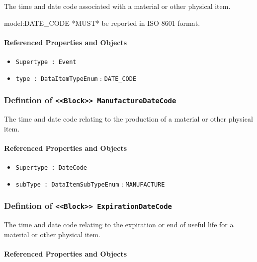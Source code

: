 The time and date code associated with a material or other physical item.
  
 {model:DATE_CODE} *MUST* be reported in ISO 8601 format.

\FloatBarrier
\paragraph{Referenced Properties and Objects}

\begin{itemize}
\item \texttt{Supertype : Event}

\item \texttt{type : DataItemTypeEnum} : \texttt{DATE_CODE}

\end{itemize}
\FloatBarrier
\subsubsection{Defintion of \texttt{<<Block>> ManufactureDateCode}}
  \label{type:ManufactureDateCode}

\FloatBarrier

The time and date code relating to the production of a material or other physical item.

\FloatBarrier
\paragraph{Referenced Properties and Objects}

\begin{itemize}
\item \texttt{Supertype : DateCode}

\item \texttt{subType : DataItemSubTypeEnum} : \texttt{MANUFACTURE}

\end{itemize}
\FloatBarrier
\subsubsection{Defintion of \texttt{<<Block>> ExpirationDateCode}}
  \label{type:ExpirationDateCode}

\FloatBarrier

The time and date code relating to the expiration or end of useful life for a material or other physical item.

\FloatBarrier
\paragraph{Referenced Properties and Objects}

